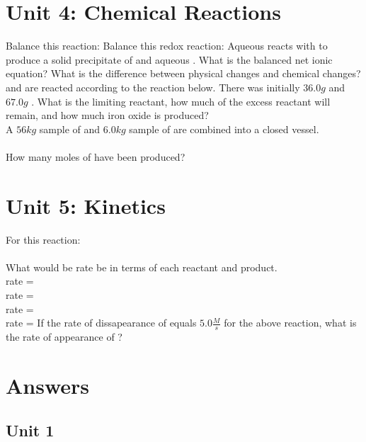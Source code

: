 \documentclass{article}
\begin{document}
\section{Unit 4: Chemical Reactions}
\ProblemSet
Balance this reaction:
\ProblemSet
Balance this redox reaction: 
\ProblemSet
Aqueous  reacts with  to produce a solid precipitate of  and aqueous . What is the balanced net ionic equation? 
\ProblemSet
What is the difference between physical changes and chemical changes?
\ProblemSet
{} and  are reacted according to the reaction below. There was initially \(36.0g\)  and \(67.0g\) . What is the limiting reactant, how much of the excess reactant will remain, and how much iron oxide is produced? \\
\ProblemSet
A \(56kg\) sample of  and \(6.0kg\) sample of  are combined into a closed vessel. \\
 \\
How many moles of  have been produced?
\section{Unit 5: Kinetics}
\ProblemSet
For this reaction: \\
 \\
What would be rate be in terms of each reactant and product. \\
 \hspace{0.5em} rate = \\
 \hspace{0.5em} rate = \\
 \hspace{0.5em} rate = \\
 \hspace{0.5em} rate = 
\ProblemSet
If the rate of dissapearance of  equals \(5.0\frac{M}{s}\) for the above reaction, what is the rate of appearance of ?


\setcounter{yayCounter}{1}
\newpage
\section{Answers}
\subsection{Unit 1}
\end{document}
